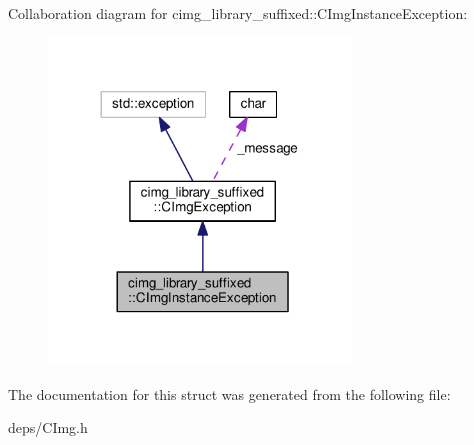 Collaboration diagram for cimg\+\_\+library\+\_\+suffixed\+:\+:C\+Img\+Instance\+Exception\+:
\nopagebreak
\begin{figure}[H]
\begin{center}
\leavevmode
\includegraphics[width=228pt]{d0/d65/structcimg__library__suffixed_1_1CImgInstanceException__coll__graph}
\end{center}
\end{figure}


The documentation for this struct was generated from the following file\+:\begin{DoxyCompactItemize}
\item 
deps/C\+Img.\+h\end{DoxyCompactItemize}
